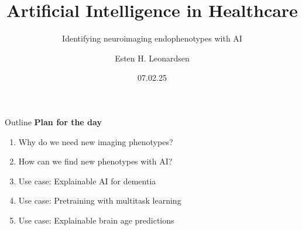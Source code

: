 \documentclass[10pt]{beamer}
\title{Artificial Intelligence in Healthcare}
\subtitle{Identifying neuroimaging endophenotypes with AI}
\author{Esten H. Leonardsen}
\date{07.02.25}
\begin{document}
	\begin{frame}
	 	\maketitle
	\end{frame}

    \begin{frame}{Outline}
        \textbf{Plan for the day}
        \begin{enumerate}
            \item Why do we need new imaging phenotypes?
            \item How can we find new phenotypes with AI?
            \item Use case: Explainable AI for dementia
            \item Use case: Pretraining with multitask learning
            \item Use case: Explainable brain age predictions
        \end{enumerate}
    \end{frame}

    
\end{document}
